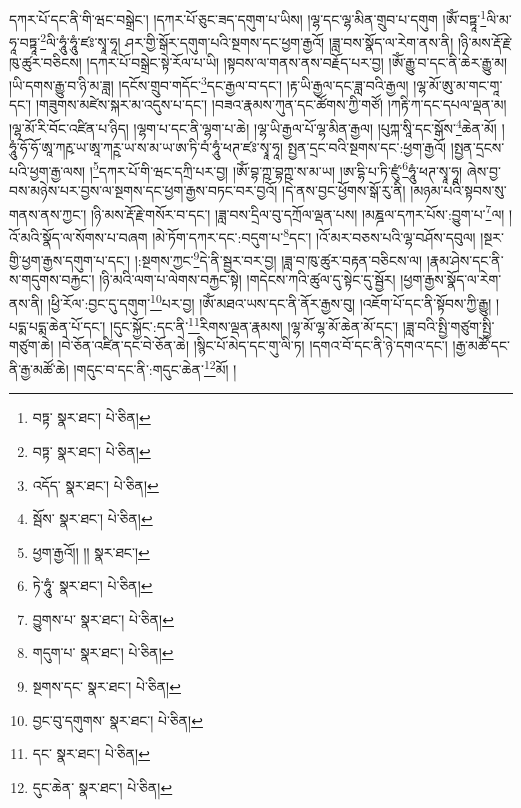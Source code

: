 དཀར་པོ་དང་ནི་གི་ཝང་བསྒྲེང་། །དཀར་པོ་ཅུང་ཟད་དགུག་པ་ཡིས། །ལྷ་དང་ལྷ་མིན་གྲུབ་པ་དགུག །ཨོཾ་བཏྟཱ་\footnote{བཏྟ་  སྣར་ཐང་།  པེ་ཅིན། }ལི་མ་ཧཱ་བཏྟཱ་\footnote{བཏྟ་  སྣར་ཐང་།  པེ་ཅིན། }ལི་ཧཱུཾ་ཧཱུཾ་ཛཿ་སྭཱ་ཧཱ། ཤར་གྱི་སྒོར་དགུག་པའི་སྔགས་དང་ཕྱག་རྒྱའོ། །ཟླ་བས་སྣོད་ལ་རེག་ནས་ནི། །ཉི་མས་རྡོ་རྗེ་ཁུ་ཚུར་བཅིངས། །དཀར་པོ་བསྒྲེང་སྟེ་རོལ་པ་ཡི། །སྟབས་ལ་གནས་ནས་བརྗོད་པར་བྱ། །ཨོཾ་རྒྱུ་བ་དང་ནི་ཆེར་རྒྱུ་མ། །ཡི་དགས་རྒྱུ་བ་ཉི་མ་ཟླ། །དངོས་གྲུབ་གདོང་\footnote{འདོད་  སྣར་ཐང་།  པེ་ཅིན། }དང་རྒྱལ་བ་དང་། །རྟ་ཡི་རྒྱལ་དང་ཟླ་བའི་རྒྱལ། །ལྷ་མོ་ཨུ་མ་གང་གཱ་དང་། །གཟུགས་མཛེས་སྐར་མ་འདུས་པ་དང་། །བཟའ་རྣམས་ཀུན་དང་ཚོགས་ཀྱི་གཙོ། །ཀརྟི་ཀ་དང་དཔལ་ལྡན་མ། །ལྷ་མོ་རི་བོང་འཛིན་པ་ཉིད། །ལྷག་པ་དང་ནི་ལྷག་པ་ཆེ། །ལྷ་ཡི་རྒྱལ་པོ་ལྷ་མིན་རྒྱལ། །པུཀྐ་སཱི་དང་སྒོས་\footnote{སྦོས་  སྣར་ཐང་།  པེ་ཅིན། }ཆེན་མོ། །ཧཱུཾ་ཧོ་ཧོ་ཨཱ་ཀརྵ་ཡ་ཨཱ་ཀཪྵ་ཡ་ས་མ་ཡ་ཨ་ཏི་བཾ་ཧཱུཾ་ཕཊ་ཛཿ་སྭཱ་ཧཱ། སྤྱན་དྲང་བའི་སྔགས་དང་:ཕྱག་རྒྱའོ། །སྤྱན་དྲངས་པའི་ཕྱག་རྒྱ་ལས། །\footnote{ཕྱག་རྒྱའོ།། །།  སྣར་ཐང་། }དཀར་པོ་གི་ཝང་དཀྲི་པར་བྱ། །ཨོཾ་བྷ་ཀྵ་བྷཀྵ་ས་མ་ཡ། །ཨ་དྷི་པ་ཏི་ཛུཾ་\footnote{ཏེ་ཧཱུཾ་  སྣར་ཐང་།  པེ་ཅིན། }ཧཱུཾ་ཕཊ་སྭཱ་ཧཱ། ཞེས་བྱ་བས་མཉེས་པར་བྱས་ལ་སྔགས་དང་ཕྱག་རྒྱས་བཏང་བར་བྱའོ། །དེ་ནས་བྱང་ཕྱོགས་སྒོ་རུ་ནི། །མཉམ་པའི་སྟབས་སུ་གནས་ནས་ཀྱང་། །ཉི་མས་རྡོ་རྗེ་གསོར་བ་དང་། །ཟླ་བས་དྲིལ་བུ་དཀྲོལ་ལྡན་པས། །མཎྜལ་དཀར་པོས་:བྱུག་པ་\footnote{བྱུགས་པ་  སྣར་ཐང་།  པེ་ཅིན། }ལ། །འོ་མའི་སྣོད་ལ་སོགས་པ་བཞག །མེ་ཏོག་དཀར་དང་:བདུག་པ་\footnote{གདུག་པ་  སྣར་ཐང་།  པེ་ཅིན། }དང་། །འོ་མར་བཅས་པའི་ལྷ་བཤོས་དབུལ། །སྔར་གྱི་ཕྱག་རྒྱས་དགུག་པ་དང་། །:སྔགས་ཀྱང་\footnote{སྔགས་དང་  སྣར་ཐང་།  པེ་ཅིན། }དེ་ནི་སྦྱར་བར་བྱ། །ཟླ་བ་ཁུ་ཚུར་བརྟན་བཅིངས་ལ། །རྣམ་ཤེས་དང་ནི་ས་གདུགས་བརྐྱང་། །ཉི་མའི་ལག་པ་ལེགས་བརྐྱང་སྟེ། །གདེངས་ཀའི་ཚུལ་དུ་སྟེང་དུ་སྦྱོར། །ཕྱག་རྒྱས་སྣོད་ལ་རེག་ནས་ནི། །ཕྱི་རོལ་:བྱང་དུ་དགུག་\footnote{བྱང་བུ་དགུགས་  སྣར་ཐང་།  པེ་ཅིན། }པར་བྱ། །ཨོཾ་མཐའ་ཡས་དང་ནི་ནོར་རྒྱས་བུ། །འཇོག་པོ་དང་ནི་སྟོབས་ཀྱི་རྒྱུ། །པདྨ་པདྨ་ཆེན་པོ་དང་། །དུང་སྐྱོང་:དང་ནི་\footnote{དང་  སྣར་ཐང་།  པེ་ཅིན། }རིགས་ལྡན་རྣམས། །ལྷ་མོ་ལྷ་མོ་ཆེན་མོ་དང་། །ཟླ་བའི་སྤྱི་གཙུག་སྤྱི་གཙུག་ཆེ། །བེ་ཅོན་འཛིན་དང་བེ་ཅོན་ཆེ། །སྙིང་པོ་མེད་དང་གུ་ལི་ཏ། །དགའ་བོ་དང་ནི་ཉེ་དགའ་དང་། །རྒྱ་མཚོ་དང་ནི་རྒྱ་མཚོ་ཆེ། །གདུང་བ་དང་ནི་:གདུང་ཆེན་\footnote{དུང་ཆེན་  སྣར་ཐང་།  པེ་ཅིན། }མོ། །
